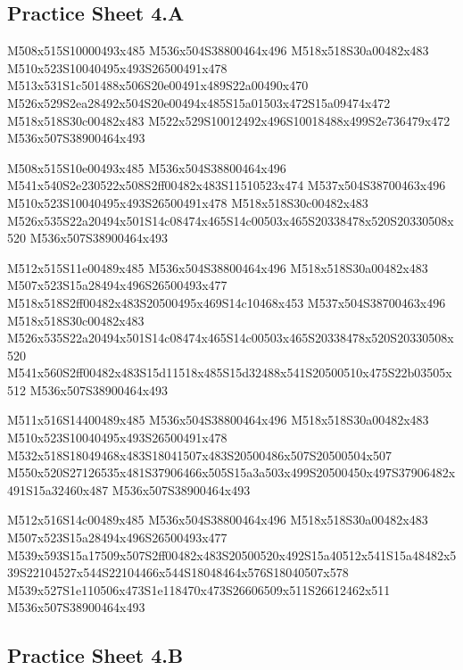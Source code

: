 \documentclass{article}
\begin{document}
\subsection{Practice Sheet 4.A}

\begin{multicols}{5}
\begin{center}

M508x515S10000493x485 %
M536x504S38800464x496 %
M518x518S30a00482x483 %
M510x523S10040495x493S26500491x478 %
M513x531S1c501488x506S20e00491x489S22a00490x470 %
M526x529S2ea28492x504S20e00494x485S15a01503x472S15a09474x472 %
M518x518S30c00482x483 %
M522x529S10012492x496S10018488x499S2e736479x472 %
M536x507S38900464x493 %
\vfil
\columnbreak

M508x515S10e00493x485 %
M536x504S38800464x496 %
M541x540S2e230522x508S2ff00482x483S11510523x474 %
M537x504S38700463x496 %
M510x523S10040495x493S26500491x478 %
M518x518S30c00482x483 %
M526x535S22a20494x501S14c08474x465S14c00503x465S20338478x520S20330508x520 %
M536x507S38900464x493 %
\vfil
\columnbreak

M512x515S11e00489x485 %
M536x504S38800464x496 %
M518x518S30a00482x483 %
M507x523S15a28494x496S26500493x477 %
M518x518S2ff00482x483S20500495x469S14c10468x453 %
M537x504S38700463x496 %
M518x518S30c00482x483 %
M526x535S22a20494x501S14c08474x465S14c00503x465S20338478x520S20330508x520 %
M541x560S2ff00482x483S15d11518x485S15d32488x541S20500510x475S22b03505x512 %
M536x507S38900464x493 %
\vfil
\columnbreak

M511x516S14400489x485 %
M536x504S38800464x496 %
M518x518S30a00482x483 %
M510x523S10040495x493S26500491x478 %
M532x518S18049468x483S18041507x483S20500486x507S20500504x507 %
M550x520S27126535x481S37906466x505S15a3a503x499S20500450x497S37906482x491S15a32460x487 %
M536x507S38900464x493 %
\vfil
\columnbreak

M512x516S14c00489x485 %
M536x504S38800464x496 %
M518x518S30a00482x483 %
M507x523S15a28494x496S26500493x477 %
M539x593S15a17509x507S2ff00482x483S20500520x492S15a40512x541S15a48482x539S22104527x544S22104466x544S18048464x576S18040507x578 %
M539x527S1e110506x473S1e118470x473S26606509x511S26612462x511 %
M536x507S38900464x493 %
\vfil

\end{center}
\end{multicols}

\subsection{Practice Sheet 4.B}
\end{document}

